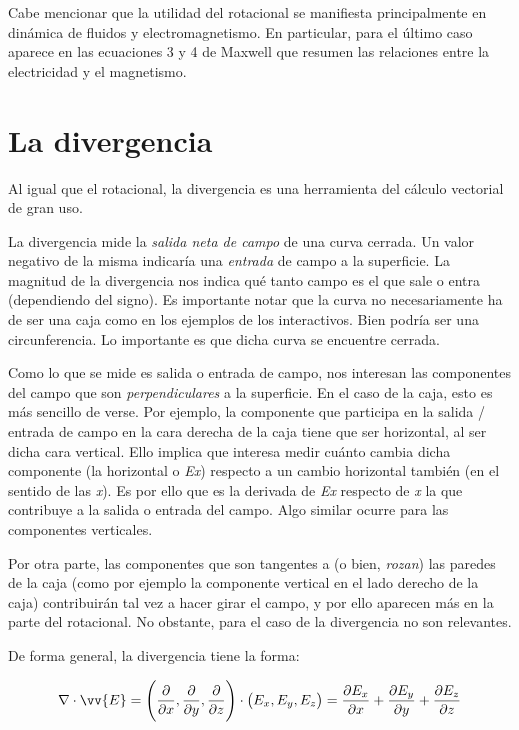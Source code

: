 \documentclass{article}
\begin{document}
Cabe mencionar que la utilidad del rotacional se manifiesta principalmente en dinámica de fluidos y electromagnetismo. En particular, para el último caso aparece en las ecuaciones 3 y 4 de Maxwell que resumen las relaciones entre la electricidad y el magnetismo.\bigskip

\section{La divergencia}

Al igual que el rotacional, la divergencia es una herramienta del cálculo vectorial de gran uso.\bigskip

La divergencia mide la \emph{salida neta de campo} de una curva cerrada. Un valor negativo de la misma indicaría una \emph{entrada} de campo a la superficie. La magnitud de la divergencia nos indica qué tanto campo es el que sale o entra (dependiendo del signo). Es importante notar que la curva no necesariamente ha de ser una caja como en los ejemplos de los interactivos. Bien podría ser una circunferencia. Lo importante es que dicha curva se encuentre cerrada.\bigskip

Como lo que se mide es salida o entrada de campo, nos interesan las componentes del campo que son \emph{perpendiculares} a la superficie. En el caso de la caja, esto es más sencillo de verse. Por ejemplo, la componente que participa en la salida / entrada de campo en la cara derecha de la caja tiene que ser horizontal, al ser dicha cara vertical. Ello implica que interesa medir cuánto cambia dicha componente (la horizontal o \emph{Ex}) respecto a un cambio horizontal también (en el sentido de las \emph{x}). Es por ello que es la derivada de \emph{Ex} respecto de \emph{x} la que contribuye a la salida o entrada del campo. Algo similar ocurre para las componentes verticales.\bigskip

Por otra parte, las componentes que son tangentes a (o bien, \emph{rozan}) las paredes de la caja (como por ejemplo la componente vertical en el lado derecho de la caja) contribuirán tal vez a hacer girar el campo, y por ello aparecen más en la parte del rotacional. No obstante, para el caso de la divergencia no son relevantes.\bigskip

De forma general, la divergencia tiene la forma:\bigskip

\begin{equation}
\nabla\cdot\vv{E}=\Bigg(\frac{\partial}{\partial x},\frac{\partial}{\partial y},\frac{\partial}{\partial z}\Bigg)\cdot\big(E_x,E_y,E_z\big)=\frac{\partial E_x}{\partial x}+\frac{\partial E_y}{\partial y}+\frac{\partial E_z}{\partial z}
\end{equation}\bigskip
\end{document}
